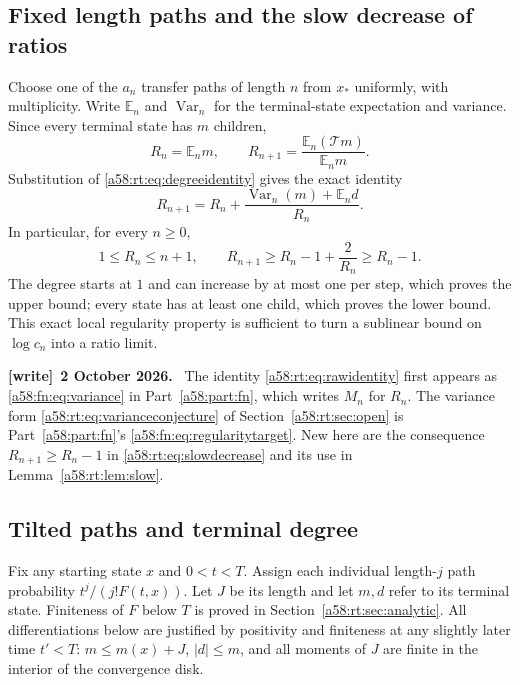 \documentclass[11pt,letterpaper]{article}
\theoremstyle{remark}
\newcommand{\TT}{\mathcal T}
\newcommand{\E}{\mathbb E}
\newcommand{\Var}{\operatorname{Var}}
\newenvironment{writenote}[1][]{\par\smallskip\begingroup\small
 \noindent\textbf{[write]}\if\relax\detokenize{#1}\relax\else~\textbf{#1.}\fi\ }%
 {\par\endgroup\smallskip}
\begin{document}
\subsection{Fixed length paths and the slow decrease of ratios}
Choose one of the $a_n$ transfer paths of length $n$ from $x_*$ uniformly,
with multiplicity. Write $\E_n$ and $\Var_n$ for the terminal-state
expectation and variance. Since every terminal state has $m$ children,
\[
 R_n=\E_n m,
 \qquad R_{n+1}=\frac{\E_n(\TT m)}{\E_n m}.
\]
Substitution of \eqref{a58:rt:eq:degreeidentity} gives the exact identity
\begin{equation}\label{a58:rt:eq:rawidentity}
 R_{n+1}=R_n+\frac{\Var_n(m)+\E_n d}{R_n}.
\end{equation}
In particular, for every $n\ge0$,
\begin{equation}\label{a58:rt:eq:slowdecrease}
 1\le R_n\le n+1,\qquad
 R_{n+1}\ge R_n-1+\frac2{R_n}\ge R_n-1.
\end{equation}
The degree starts at $1$ and can increase by at most one per step, which
proves the upper bound; every state has at least one child, which proves
the lower bound. This exact local regularity property is sufficient to
turn a sublinear bound on $\log c_n$ into a ratio limit.
\begin{writenote}[2 October 2026]
The identity \eqref{a58:rt:eq:rawidentity} first appears as \eqref{a58:fn:eq:variance} in Part~\ref{a58:part:fn}, which writes $M_n$ for $R_n$. The variance form \eqref{a58:rt:eq:varianceconjecture} of Section~\ref{a58:rt:sec:open} is Part~\ref{a58:part:fn}'s \eqref{a58:fn:eq:regularitytarget}. New here are the consequence $R_{n+1}\ge R_n-1$ in \eqref{a58:rt:eq:slowdecrease} and its use in Lemma~\ref{a58:rt:lem:slow}.
\end{writenote}

\subsection{Tilted paths and terminal degree}
Fix any starting state $x$ and $0<t<T$. Assign each individual length-$j$
path probability $t^j/(j!F(t,x))$. Let $J$ be its length and let $m,d$
refer to its terminal state. Finiteness of $F$ below $T$ is proved in
Section~\ref{a58:rt:sec:analytic}. All differentiations below are justified by
positivity and finiteness at any slightly later time $t'<T$:
$m\le m(x)+J$, $|d|\le m$, and all moments of $J$ are finite in the
interior of the convergence disk.
\end{document}
